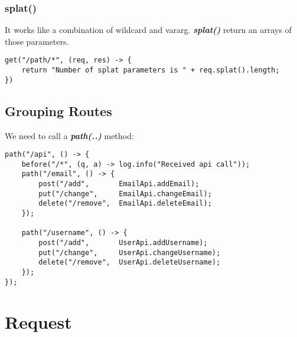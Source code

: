 \documentclass{report}
\begin{document}
\section{splat()}
It works like a combination of wildcard and vararg. \textbf{\textit{splat()}} return an arrays of those parameters.
\begin{verbatim}
get("/path/*", (req, res) -> {
    return "Number of splat parameters is " + req.splat().length;
})
\end{verbatim}


\chapter{Grouping Routes}
We need to call a \textbf{\textit{path(..)}} method:

\begin{verbatim}
path("/api", () -> {
    before("/*", (q, a) -> log.info("Received api call"));
    path("/email", () -> {
        post("/add",       EmailApi.addEmail);
        put("/change",     EmailApi.changeEmail);
        delete("/remove",  EmailApi.deleteEmail);
    });

    path("/username", () -> {
        post("/add",       UserApi.addUsername);
        put("/change",     UserApi.changeUsername);
        delete("/remove",  UserApi.deleteUsername);
    });
});
\end{verbatim}




\part{Request}
\end{document}
